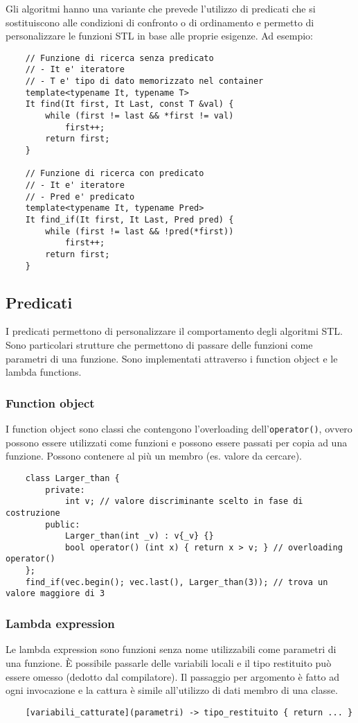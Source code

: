 \documentclass[a4paper]{article}
\begin{document}
Gli algoritmi hanno una variante che prevede l'utilizzo di predicati che si sostituiscono alle condizioni di confronto o di
ordinamento e permetto di personalizzare le funzioni STL in base alle proprie esigenze. Ad esempio:

\begin{lstlisting}
	// Funzione di ricerca senza predicato
	// - It e' iteratore
	// - T e' tipo di dato memorizzato nel container
	template<typename It, typename T>
	It find(It first, It Last, const T &val) {
		while (first != last && *first != val)
			first++;
		return first;
	}

	// Funzione di ricerca con predicato
	// - It e' iteratore
	// - Pred e' predicato
	template<typename It, typename Pred>
	It find_if(It first, It Last, Pred pred) {
		while (first != last && !pred(*first))
			first++;
		return first;
	}
\end{lstlisting}

\subsection{Predicati}
I predicati permettono di personalizzare il comportamento degli algoritmi STL. Sono particolari strutture che permettono di
passare delle funzioni come parametri di una funzione. Sono implementati attraverso i function object e le lambda functions.

\subsubsection*{Function object}
I function object sono classi che contengono l'overloading dell'\verb|operator()|, ovvero possono essere utilizzati come
funzioni e possono essere passati per copia ad una funzione. Possono contenere al più un membro (es. valore da cercare).
\begin{lstlisting}
	class Larger_than {
		private:
			int v; // valore discriminante scelto in fase di costruzione
		public:
			Larger_than(int _v) : v{_v} {}
			bool operator() (int x) { return x > v; } // overloading operator()
	};
	find_if(vec.begin(); vec.last(), Larger_than(3)); // trova un valore maggiore di 3
\end{lstlisting}

\subsubsection*{Lambda expression}
Le lambda expression sono funzioni senza nome utilizzabili come parametri di una funzione. È possibile passarle delle variabili
locali e il tipo restituito può essere omesso (dedotto dal compilatore). Il passaggio per argomento è fatto ad ogni invocazione
e la cattura è simile all'utilizzo di dati membro di una classe. 
\begin{lstlisting}
	[variabili_catturate](parametri) -> tipo_restituito { return ... }
\end{lstlisting}
\end{document}
